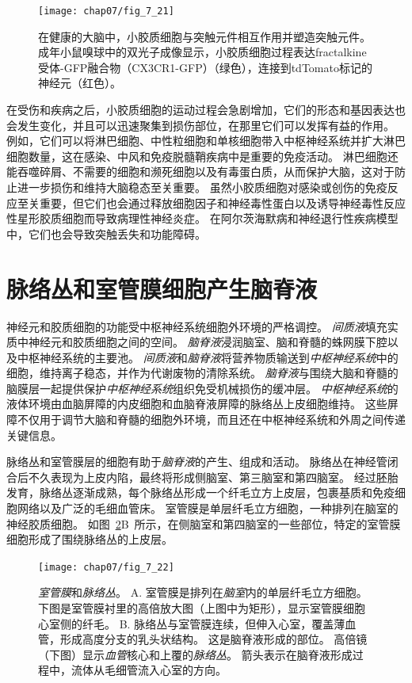 \begin{figure}[htbp]
	\centering
	\texttt{[image: chap07/fig\_7\_21]}
	\caption{在健康的大脑中，小胶质细胞与突触元件相互作用并塑造突触元件。
		成年小鼠嗅球中的双光子成像显示，小胶质细胞过程表达fractalkine受体-GFP融合物（CX3CR1-GFP）（绿色），连接到tdTomato标记的神经元（红色）。}
	\label{fig:7_21}
\end{figure}


在受伤和疾病之后，小胶质细胞的运动过程会急剧增加，它们的形态和基因表达也会发生变化，并且可以迅速聚集到损伤部位，在那里它们可以发挥有益的作用。
例如，它们可以将淋巴细胞、中性粒细胞和单核细胞带入中枢神经系统并扩大淋巴细胞数量，这在感染、中风和免疫脱髓鞘疾病中是重要的免疫活动。
淋巴细胞还能吞噬碎屑、不需要的细胞和濒死细胞以及有毒蛋白质，从而保护大脑，这对于防止进一步损伤和维持大脑稳态至关重要。
虽然小胶质细胞对感染或创伤的免疫反应至关重要，但它们也会通过释放细胞因子和神经毒性蛋白以及诱导神经毒性反应性星形胶质细胞而导致病理性神经炎症。
在阿尔茨海默病和神经退行性疾病模型中，它们也会导致突触丢失和功能障碍。


\section{脉络丛和室管膜细胞产生脑脊液}

神经元和胶质细胞的功能受中枢神经系统细胞外环境的严格调控。
\textit{间质液}填充实质中神经元和胶质细胞之间的空间。
\textit{脑脊液}浸润脑室、脑和脊髓的蛛网膜下腔以及中枢神经系统的主要池。
\textit{间质液}和\textit{脑脊液}将营养物质输送到\textit{中枢神经系统}中的细胞，维持离子稳态，并作为代谢废物的清除系统。
\textit{脑脊液}与围绕大脑和脊髓的脑膜层一起提供保护\textit{中枢神经系统}组织免受机械损伤的缓冲层。
\textit{中枢神经系统}的液体环境由血脑屏障的内皮细胞和血脑脊液屏障的脉络丛上皮细胞维持。
这些屏障不仅用于调节大脑和脊髓的细胞外环境，而且还在中枢神经系统和外周之间传递关键信息。


脉络丛和室管膜层的细胞有助于\textit{脑脊液}的产生、组成和活动。
脉络丛在神经管闭合后不久表现为上皮内陷，最终将形成侧脑室、第三脑室和第四脑室。
经过胚胎发育，脉络丛逐渐成熟，每个脉络丛形成一个纤毛立方上皮层，包裹基质和免疫细胞网络以及广泛的毛细血管床。
室管膜是单层纤毛立方细胞，一种排列在脑室的神经胶质细胞。
如图~\ref{fig:7_22}B~所示，在侧脑室和第四脑室的一些部位，特定的室管膜细胞形成了围绕脉络丛的上皮层。


\begin{figure}[htbp]
	\centering
	\texttt{[image: chap07/fig\_7\_22]}
	\caption{\textit{室管膜}和\textit{脉络丛}。
		A. 室管膜是排列在\textit{脑室}内的单层纤毛立方细胞。
		下图是室管膜衬里的高倍放大图（上图中为矩形），显示室管膜细胞心室侧的纤毛。
		B. 脉络丛与室管膜连续，但伸入心室，覆盖薄血管，形成高度分支的乳头状结构。
		这是脑脊液形成的部位。
		高倍镜（下图）显示\textit{血管}核心和上覆的\textit{脉络丛}。
		箭头表示在脑脊液形成过程中，流体从毛细管流入心室的方向。}
	\label{fig:7_22}
\end{figure}



